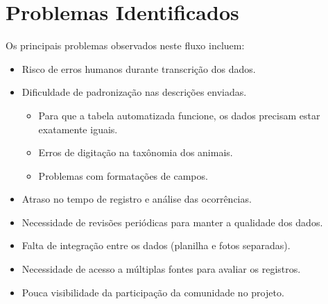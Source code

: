 \section{Problemas Identificados}

Os principais problemas observados neste fluxo incluem:

\begin{itemize}
    \item Risco de erros humanos durante transcrição dos dados.
    
    \item Dificuldade de padronização nas descrições enviadas.
    \begin{itemize}
        \item Para que a tabela automatizada funcione, os dados precisam estar exatamente iguais.
        \item Erros de digitação na taxônomia dos animais.
        \item Problemas com formatações de campos.
    \end{itemize}
    
    \item Atraso no tempo de registro e análise das ocorrências.
    
    \item Necessidade de revisões periódicas para manter a qualidade dos dados.
    
    \item Falta de integração entre os dados (planilha e fotos separadas).
    
    \item Necessidade de acesso a múltiplas fontes para avaliar os registros.
    
    \item Pouca visibilidade da participação da comunidade no projeto.
\end{itemize}
